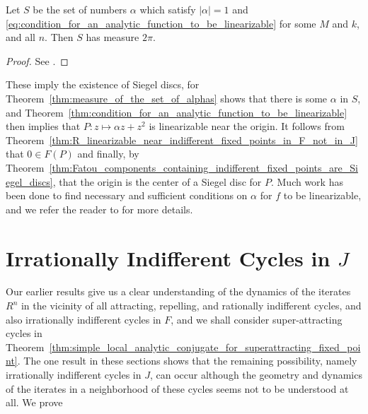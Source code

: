 \begin{theorem}
    \label{thm:measure_of_the_set_of_alphas}
    Let $S$ be the set of numbers $\alpha$ which satisfy $|\alpha| = 1$ and
    \eqref{eq:condition_for_an_analytic_function_to_be_linearizable} for some
    $M$ and $k$, and all $n$. Then $S$ has measure $2 \pi$.
\end{theorem}
\begin{proof}
    See \cite[141--142]{Beardon1991}.
\end{proof}

These imply the existence of Siegel discs, for
Theorem~\ref{thm:measure_of_the_set_of_alphas} shows that there is some $\alpha$
in $S$, and
Theorem~\ref{thm:condition_for_an_analytic_function_to_be_linearizable} then
implies that $P: z \mapsto \alpha z + z^2$ is linearizable near the origin. It
follows from
Theorem~\ref{thm:R_linearizable_near_indifferent_fixed_points_in_F_not_in_J}
that $0 \in F(P)$ and finally, by
Theorem~\ref{thm:Fatou_components_containing_indifferent_fixed_points_are_Siegel_discs},
that the origin is the center of a Siegel disc for $P$. Much work has been done
to find necessary and sufficient conditions on $\alpha$ for $f$ to be
linearizable, and we refer the reader to \cite{Herman1986} for more details.

\section{Irrationally Indifferent Cycles in $J$}
\label{sec:irrationally_indifferent_cycles_in_J}

Our earlier results give us a clear understanding of the dynamics of the
iterates $R^n$ in the vicinity of all attracting, repelling, and rationally
indifferent cycles, and also irrationally indifferent cycles in $F$, and we
shall consider super-attracting cycles in Theorem~\ref{thm:simple_local_analytic_conjugate_for_superattracting_fixed_point}. The one
result in these sections shows that the remaining possibility, namely
irrationally indifferent cycles in $J$, can occur although the geometry and
dynamics of the iterates in a neighborhood of these cycles seems not to be
understood at all. We prove

